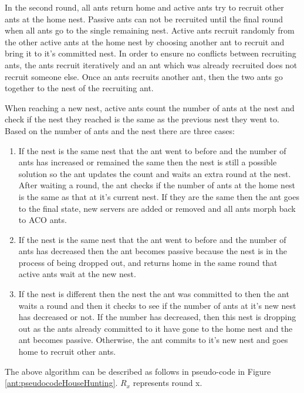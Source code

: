 In the second round, all ants return home and active ants try to recruit other ants at the home nest. Passive ants can not be recruited until the final round when all ants go to the single remaining nest. Active ants recruit randomly from the other active ants at the home nest by choosing another ant to recruit and bring it to it's committed nest. In order to ensure no conflicts between recruiting ants, the ants recruit iteratively and an ant which was already recruited does not recruit someone else. Once an ants recruits another ant, then the two ants go together to the nest of the recruiting ant.

When reaching a new nest, active ants count the number of ants at the nest and check if the nest they reached is the same as the previous nest they went to. Based on the number of ants and the nest there are three cases:

\begin{enumerate}
	\item If the nest is the same nest that the ant went to before and the number of ants has increased or remained the same then the nest is still a possible solution so the ant updates the count and waits an extra round at the nest. After waiting a round, the ant checks if the number of ants at the home nest is the same as that at it's current nest. If they are the same then the ant goes to the final state, new servers are added or removed and all ants morph back to ACO ants.
	\item If the nest is the same nest that the ant went to before and the number of ants has decreased then the ant becomes passive because the nest is in the process of being dropped out, and returns home in the same round that active ants wait at the new nest.
	\item If the nest is different then the nest the ant was committed to then the ant waits a round and then it checks to see if the number of ants at it's new nest has decreased or not. If the number has decreased, then this nest is dropping out as the ants already committed to it have gone to the home nest and the ant becomes passive. Otherwise, the ant commits to it's new nest and goes home to recruit other ants.
\end{enumerate}

The above algorithm can be described as follows in pseudo-code in Figure \ref{ant:pseudocodeHouseHunting}. $R_{x}$ represents round x.

